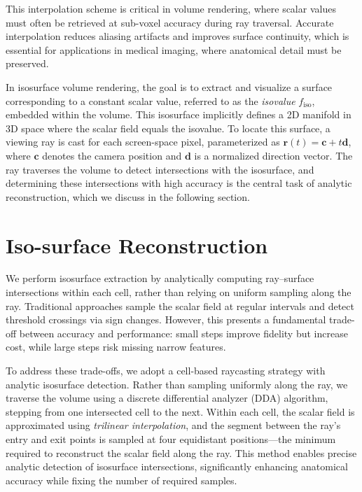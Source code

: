 \documentclass[conference]{IEEEtran}
\begin{document}
This interpolation scheme is critical in volume rendering, where scalar values must often be retrieved at sub-voxel accuracy during ray traversal. Accurate interpolation reduces aliasing artifacts and improves surface continuity, which is essential for applications in medical imaging, where anatomical detail must be preserved.

In isosurface volume rendering, the goal is to extract and visualize a surface corresponding to a constant scalar value, referred to as the \textit{isovalue} \( f_{\text{iso}} \), embedded within the volume. This isosurface implicitly defines a 2D manifold in 3D space where the scalar field equals the isovalue. To locate this surface, a viewing ray is cast for each screen-space pixel, parameterized as \( \mathbf{r}(t) = \mathbf{c} + t\mathbf{d} \), where \( \mathbf{c} \) denotes the camera position and \( \mathbf{d} \) is a normalized direction vector. The ray traverses the volume to detect intersections with the isosurface, and determining these intersections with high accuracy is the central task of analytic reconstruction, which we discuss in the following section.

\section{Iso-surface Reconstruction}

We perform isosurface extraction by analytically computing ray–surface intersections within each cell, rather than relying on uniform sampling along the ray. Traditional approaches sample the scalar field at regular intervals and detect threshold crossings via sign changes. However, this presents a fundamental trade-off between accuracy and performance: small steps improve fidelity but increase cost, while large steps risk missing narrow features.

To address these trade-offs, we adopt a cell-based raycasting strategy with analytic isosurface detection. Rather than sampling uniformly along the ray, we traverse the volume using a discrete differential analyzer (DDA) algorithm, stepping from one intersected cell to the next. Within each cell, the scalar field is approximated using \textit{trilinear interpolation}, and the segment between the ray’s entry and exit points is sampled at four equidistant positions—the minimum required to reconstruct the scalar field along the ray. This method enables precise analytic detection of isosurface intersections, significantly enhancing anatomical accuracy while fixing the number of required samples.
\end{document}
